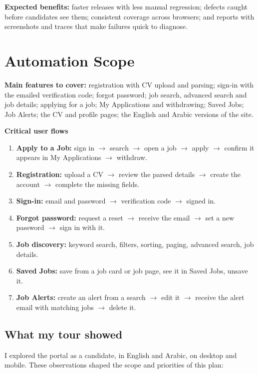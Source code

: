 \documentclass[11pt,a4paper]{article}
\begin{document}
\textbf{Expected benefits:} faster releases with less manual regression; defects caught before candidates see
them; consistent coverage across browsers; and reports with screenshots and traces that make failures
quick to diagnose.

\section{Automation Scope}

\textbf{Main features to cover:} registration with CV upload and parsing; sign-in with the emailed
verification code; forgot password; job search, advanced search and job details; applying for a job;
My Applications and withdrawing; Saved Jobs; Job Alerts; the CV and profile pages; the English and Arabic
versions of the site.

\textbf{Critical user flows}
\begin{enumerate}
  \item \textbf{Apply to a Job:} sign in $\rightarrow$ search $\rightarrow$ open a job $\rightarrow$ apply
        $\rightarrow$ confirm it appears in My Applications $\rightarrow$ withdraw.
  \item \textbf{Registration:} upload a CV $\rightarrow$ review the parsed details $\rightarrow$ create the account
        $\rightarrow$ complete the missing fields.
  \item \textbf{Sign-in:} email and password $\rightarrow$ verification code $\rightarrow$ signed in.
  \item \textbf{Forgot password:} request a reset $\rightarrow$ receive the email $\rightarrow$ set a new password
        $\rightarrow$ sign in with it.
  \item \textbf{Job discovery:} keyword search, filters, sorting, paging, advanced search, job details.
  \item \textbf{Saved Jobs:} save from a job card or job page, see it in Saved Jobs, unsave it.
  \item \textbf{Job Alerts:} create an alert from a search $\rightarrow$ edit it $\rightarrow$ receive the alert
        email with matching jobs $\rightarrow$ delete it.
\end{enumerate}

\subsection*{What my tour showed}
I explored the portal as a candidate, in English and Arabic, on desktop and mobile. These observations
shaped the scope and priorities of this plan:
\end{document}
